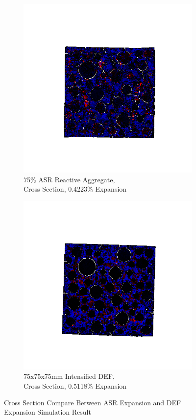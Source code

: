 \begin{figure}[ht]
\centering

    \begin{subfigure}{.5\textwidth}
      \centering
      \includegraphics[width=.8\linewidth]{Files/exp_3D/ASR/A30P75_3_stress.png}
      \caption{75\% ASR Reactive Aggregate, \\ Cross Section, 0.4223\% Expansion}
    \end{subfigure}%
    \begin{subfigure}{.5\textwidth}
      \centering
      \includegraphics[width=.8\linewidth]{Files/exp_3D/DEF/A30X-5C_3_stress.png}
      \caption{75x75x75mm Intensified DEF, \\ Cross Section, 0.5118\% Expansion}
    \end{subfigure}

  \caption{Cross Section Compare Between ASR Expansion and DEF Expansion Simulation Result}
  \label{fig:ASRvsDEF_IS}
\end{figure}

